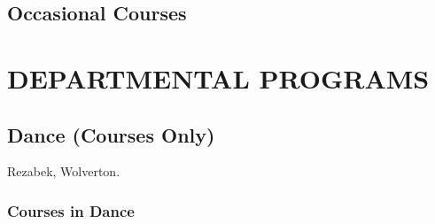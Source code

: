 \documentclass[
  letterpaper,
]{scrbook}
\begin{document}
\hypertarget{occasional-courses}{%
\section{Occasional Courses}\label{occasional-courses}}

\hypertarget{departmental-programs}{%
\chapter{DEPARTMENTAL PROGRAMS}\label{departmental-programs}}

\hypertarget{sec-dance}{%
\section{Dance (Courses Only)}\label{sec-dance}}

Rezabek, Wolverton.

\hypertarget{courses-in-dance}{%
\subsection{Courses in Dance}\label{courses-in-dance}}
\end{document}
